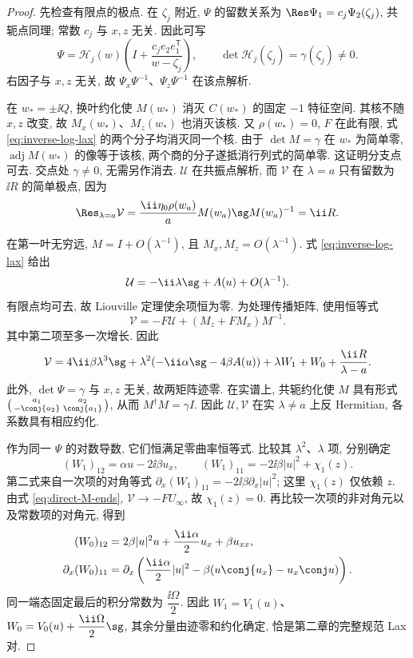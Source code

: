 \begin{proof}
先检查有限点的极点. 在 $\zeta_j$ 附近, $\Psi$ 的留数关系为
$\Res\Psi_1=c_j\Psi_2(\zeta_j)$, 共轭点同理; 常数 $c_j$ 与 $x,z$ 无关. 因此可写
\[
\Psi=\mathcal H_j(w)\left(I+\dfrac{c_j e_2e_1^{\mathsf T}}{w-\zeta_j}\right),
\qquad \det\mathcal H_j(\zeta_j)=\gamma(\zeta_j)\ne0.
\]
右因子与 $x,z$ 无关, 故 $\Psi_x\Psi^{-1}$、$\Psi_z\Psi^{-1}$ 在该点解析.

在 $w_*=\pm\ii Q$, 换叶约化使 $M(w_*)$ 消灭 $C(w_*)$ 的固定 $-1$ 特征空间. 其核不随 $x,z$ 改变, 故 $M_x(w_*)$、$M_z(w_*)$ 也消灭该核. 又 $\rho(w_*)=0$, $F$ 在此有限, 式 \eqref{eq:inverse-log-lax} 的两个分子均消灭同一个核. 由于 $\det M=\gamma$ 在 $w_*$ 为简单零, $\operatorname{adj}M(w_*)$ 的像等于该核, 两个商的分子遂抵消行列式的简单零. 这证明分支点可去. 交点处 $\gamma\ne0$, 无需另作消去. $\mathcal U$ 在共振点解析, 而 $\mathcal V$ 在 $\lambda=a$ 只有留数为 $\ii R$ 的简单极点, 因为
\[
\Res_{\lambda=a}\mathcal V
=\dfrac{\ii\eta_0\rho(w_a)}{a}M(w_a)\sg M(w_a)^{-1}=\ii R.
\]

在第一叶无穷远, $M=I+O(\lambda^{-1})$, 且 $M_x,M_z=O(\lambda^{-1})$. 式 \eqref{eq:inverse-log-lax} 给出
\[
\mathcal U=-\ii\lambda\sg+A(u)+O(\lambda^{-1}).
\]
有限点均可去, 故 Liouville 定理使余项恒为零. 为处理传播矩阵, 使用恒等式
\[
\mathcal V=-F\mathcal U+(M_z+F M_x)M^{-1}.
\]
其中第二项至多一次增长. 因此
\begin{equation}\label{eq:inverse-V-form}
\mathcal V=4\ii\beta\lambda^3\sg
+\lambda^2(-\ii\alpha\sg-4\beta A(u))
+\lambda W_1+W_0+\dfrac{\ii R}{\lambda-a}.
\end{equation}
此外, $\det\Psi=\gamma$ 与 $x,z$ 无关, 故两矩阵迹零. 在实谱上, 共轭约化使 $M$ 具有形式
$\left(\begin{smallmatrix}a_1&a_2\\-\conj{a_2}&\conj{a_1}\end{smallmatrix}\right)$, 从而 $M^\dagger M=\gamma I$. 因此 $\mathcal U,\mathcal V$ 在实 $\lambda\ne a$ 上反 Hermitian, 各系数具有相应约化.

作为同一 $\Psi$ 的对数导数, 它们恒满足零曲率恒等式. 比较其 $\lambda^2$、$\lambda$ 项, 分别确定
\[
(W_1)_{12}=\alpha u-2\ii\beta u_x,\qquad
(W_1)_{11}=-2\ii\beta|u|^2+\chi_1(z).
\]
第二式来自一次项的对角等式
$\partial_x(W_1)_{11}=-2\ii\beta\partial_x|u|^2$; 这里 $\chi_1(z)$ 仅依赖 $z$. 由式 \eqref{eq:direct-M-ends}, $\mathcal V\to-FU_\infty$, 故 $\chi_1(z)=0$. 再比较一次项的非对角元以及常数项的对角元, 得到
\begin{align*}
(W_0)_{12}&=2\beta|u|^2u+\dfrac{\ii\alpha}{2}u_x+\beta u_{xx},\\
\partial_x(W_0)_{11}
&=\partial_x\left(\dfrac{\ii\alpha}{2}|u|^2
-\beta(u\conj{u_x}-u_x\conj u)\right).
\end{align*}
同一端态固定最后的积分常数为 $\dfrac{\ii\Omega}{2}$. 因此 $W_1=V_1(u)$、$W_0=V_0(u)+\dfrac{\ii\Omega}{2}\sg$, 其余分量由迹零和约化确定, 恰是第二章的完整规范 Lax 对.


\end{proof}
